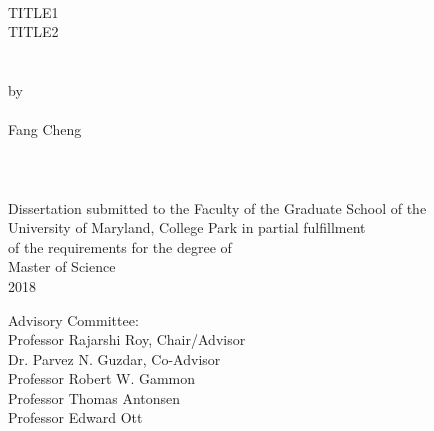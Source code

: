 
\thispagestyle{empty}
\hbox{\ }
\vspace{1in}
\renewcommand{\baselinestretch}{1}
\small\normalsize
\begin{center}

\large{{TITLE1 \\
TITLE2}}\\
\ \\
\ \\
\large{by} \\
\ \\
\large{Fang Cheng}%
\ \\
\ \\
\ \\
\ \\
\normalsize
Dissertation submitted to the Faculty of the Graduate School of the \\
University of Maryland, College Park in partial fulfillment \\
of the requirements for the degree of \\
Master of Science \\
2018
\end{center}

\vspace{7.5em}

\noindent Advisory Committee: \\
Professor Rajarshi Roy, Chair/Advisor \\
Dr. Parvez N. Guzdar, Co-Advisor \\
Professor Robert W. Gammon \\
Professor Thomas Antonsen \\
Professor Edward Ott
